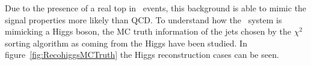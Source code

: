 Due to the presence of a real top in \ttbar~events, this background is able to mimic the signal properties more likely than QCD. To understand how the \ttbar~system is mimicking a Higgs boson, the MC truth information of the jets chosen by the $\chi^{2}$ sorting algorithm as coming from the Higgs have been studied. In figure~\ref{fig:RecohiggsMCTruth} the Higgs reconstruction cases can be seen. %


